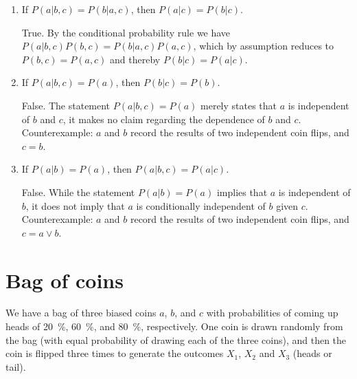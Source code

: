 \documentclass[11pt, a4paper]{article}
\begin{document}
\begin{enumerate}
    \item If $P(a | b, c) = P(b | a, c)$, then $P(a | c) = P(b | c)$.

    \begin{solution}
        True. By the conditional probability rule we have $P(a | b, c) P(b, c) = P(b | a, c) P(a, c)$, which by assumption reduces to $P(b, c) = P(a, c)$ and thereby $P(b | c) = P(a | c)$.
    \end{solution}

    \item If $P(a | b, c) = P(a)$, then $P(b | c) = P(b)$.

    \begin{solution}
        False. The statement $P(a | b, c) = P(a)$ merely states that $a$ is independent of $b$ and $c$, it makes no claim regarding the dependence of $b$ and $c$. Counterexample: $a$ and $b$ record the results of two independent coin flips, and $c = b$.
    \end{solution}

    \item If $P(a | b) = P(a)$, then $P(a | b, c) = P(a | c)$.

    \begin{solution}
        False. While the statement $P(a | b) = P(a)$ implies that $a$ is independent of $b$, it does not imply that $a$ is conditionally independent of $b$ given $c$. Counterexample: $a$ and $b$ record the results of two independent coin flips, and $c = a \vee b$.
    \end{solution}
\end{enumerate}

\newpage

\section{Bag of coins}

We have a bag of three biased coins $a$, $b$, and $c$ with probabilities of coming up heads of \qty{20}{\percent}, \qty{60}{\percent}, and \qty{80}{\percent}, respectively. One coin is drawn randomly from the bag (with equal probability of drawing each of the three coins), and then the coin is flipped three times to generate the outcomes $X_1$, $X_2$ and $X_3$ (heads or tail).
\end{document}
